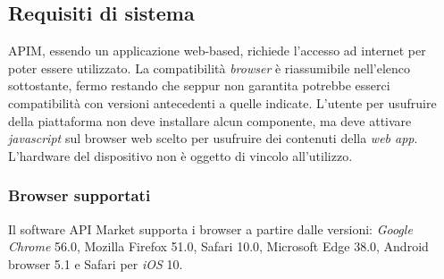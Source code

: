 \subsection{Requisiti di sistema}
APIM, essendo un applicazione web-based, richiede l'accesso ad internet per poter essere utilizzato. La compatibilità \textit{browser} è riassumibile nell'elenco sottostante, fermo restando che seppur non garantita potrebbe esserci compatibilità con versioni antecedenti a quelle indicate. L'utente per usufruire della piattaforma non deve installare alcun componente, ma deve attivare \textit{javascript} sul browser web scelto per usufruire dei contenuti della \textit{web app}.
L'hardware del dispositivo non è oggetto di vincolo all'utilizzo.

\subsubsection{Browser supportati}
Il software API Market supporta i browser a partire dalle versioni: \textit{Google Chrome} 56.0, Mozilla Firefox 51.0, Safari 10.0, Microsoft Edge 38.0, Android browser 5.1 e Safari per \textit{iOS} 10.




